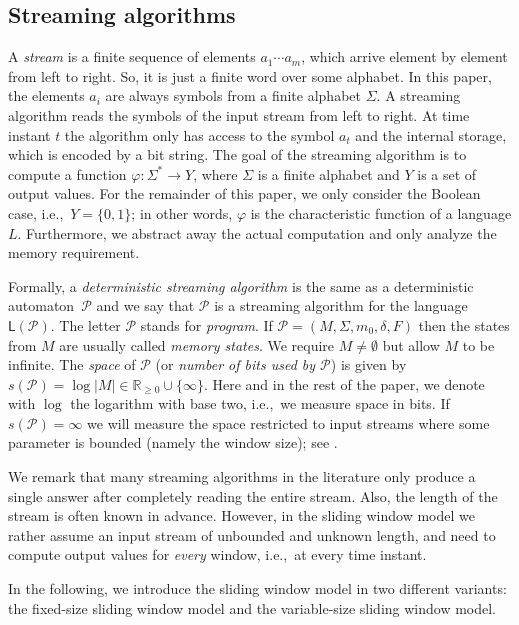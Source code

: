 \documentclass{theoretics}
\renewcommand{\P}{\mathcal{P}}
\renewcommand{\L}{\mathsf{L}}
\renewcommand{\geq}{\geqslant}
\renewcommand{\ge}{\geq}
\begin{document}
\subsection{Streaming algorithms} \label{sec streaming general}

A {\em stream} is a finite sequence of elements $a_1 \cdots a_m$,
which arrive element by element from left to right. So, it is just a finite word over some alphabet.
In this paper, the elements $a_i$ are always symbols from a finite alphabet $\Sigma$.
A streaming algorithm reads the symbols of the input stream from left to right.
At time instant $t$ the algorithm only has access to the symbol $a_t$
and the internal storage, which is encoded by a bit string.
The goal of the streaming algorithm is to compute a function $\varphi \colon \Sigma^* \to Y$,
where $\Sigma$ is a finite alphabet and $Y$ is a set of output values.
For the remainder of this paper, we only consider the Boolean case, i.e.,~$Y = \{0,1\}$;
in other words, $\varphi$ is the characteristic function of a language $L$.
Furthermore, we abstract away the actual computation and only analyze
the memory requirement.

Formally, a {\em deterministic streaming algorithm} is the same as 
a deterministic automaton~$\P$ and we say that 
$\P$ is a streaming algorithm for the language $\L(\P)$.
The letter $\P$ stands for {\em program}. If $\P = (M,\Sigma,m_0,\delta,F)$
then the states from $M$ are usually called {\em memory states}.
We require $M \neq \emptyset$ but allow $M$ to be infinite.
The {\em space} of $\P$ (or {\em number of bits used by $\P$}) is given by
$s(\P) = \log |M| \in \mathbb{R}_{\ge 0} \cup \{ \infty \}$.
Here and in the rest of the paper, we denote with $\log$
the logarithm with base two, i.e.,~we measure space in bits.
If $s(\P) = \infty$ we will measure the space restricted to input streams
where some parameter is bounded (namely the window size); see .


We remark that many streaming algorithms in the literature only produce a single answer
after completely reading the entire stream.
Also, the length of the stream is often known in advance.
However, in the sliding window model we rather assume an input stream of unbounded and unknown length,
and need to compute output values for {\em every} window, i.e.,~at every time instant.

In the following, we introduce the sliding window model in two different variants: the 
fixed-size sliding window model and the variable-size sliding window model.
\end{document}
